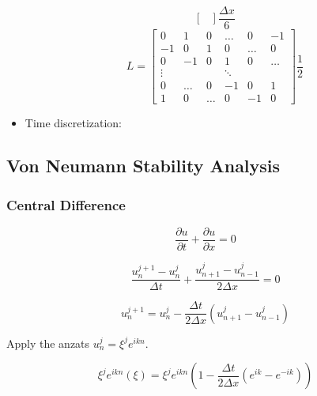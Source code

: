 \documentclass[a4paper,10pt,twoside]{article}
\begin{document}
\begin{itemize}
\begin{equation}
\begin{bmatrix}
    \end{bmatrix}\frac{\Delta x}{6}
\end{equation}
\begin{equation}
    L = \begin{bmatrix}
        0& 1& 0& \dots& 0& -1\\
        -1& 0& 1& 0& \dots& 0\\
        0& -1& 0& 1& 0& \dots\\
        \vdots&&&\ddots\\
        0& \dots& 0& -1& 0& 1\\
        1& 0& \dots& 0& -1& 0
    \end{bmatrix}\frac{1}{2}
\end{equation}
    
   
   
   
   
   \item Time discretization: 
    
\end{itemize}



\subsection{Von Neumann Stability Analysis}
\subsubsection{Central Difference}
\begin{equation}
    \frac{\partial u}{\partial t} + \frac{\partial u}{\partial x} = 0
\end{equation}

\begin{equation}
    \frac{u_{n}^{j+1} - u_{n}^j}{\Delta t} + \frac{u_{n+1}^j - u_{n-1}^j}{2 \Delta x} = 0
\end{equation}


\begin{equation}
    u_{n}^{j+1}  = u_{n}^j - \frac{\Delta t}{2 \Delta x} \left(u_{n+1}^j - u_{n-1}^j\right)
\end{equation}

Apply the anzats $u_n^j = \xi^j e^{ikn}$.

\begin{equation}
    \xi^{j} e^{ikn}(\xi) = \xi^je^{ikn} \left( 1 - \frac{\Delta t}{2 \Delta x} \left(e^{ik} - e^{-ik}\right)\right)
\end{equation}
\end{document}
